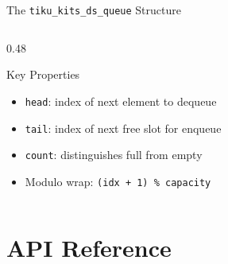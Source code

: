\documentclass[aspectratio=169, 10pt]{beamer}
\begin{document}
\begin{frame}[fragile]{The \texttt{tiku\_kits\_ds\_queue} Structure}
\begin{columns}[T]
\begin{column}{0.48\textwidth}
\vspace{0.5em}
\begin{block}{Key Properties}
\begin{itemize}
  \item \texttt{head}: index of next element to dequeue
  \item \texttt{tail}: index of next free slot for enqueue
  \item \texttt{count}: distinguishes full from empty
  \item Modulo wrap: \texttt{(idx + 1) \% capacity}
\end{itemize}
\end{block}
\end{column}
\end{columns}
\end{frame}

\section{API Reference}
\end{document}

